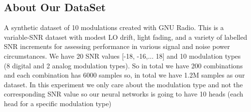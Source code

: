 \documentclass[12pt,a4paper]{article}
\begin{document}
    \subsection{About Our DataSet}
    A synthetic dataset of 10 modulations created with GNU Radio.
    This is a variable-SNR dataset with modest LO drift, light fading, and a variety of labelled SNR increments for assessing performance in various signal and noise power circumstances. \newline
    We have 20 SNR values [-18, -16,... 18] and 10 modulation types (8 digital and 2 analog modulation types). \newline
    So in total we have 200 combinations and each combination has 6000 samples so, in total we have 1.2M samples as our dataset. In this experiment we only care about the modulation type and not the corresponding SNR value so our neural networks is going to have 10 heads (each head for a specific modulation type)

    \newpage
    
\end{document}
